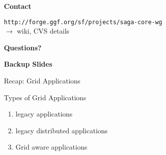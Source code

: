 \documentclass[%
  pdf,
  colorBG,
  slideColor,
  frames,
  ogf
]{prosper}
\newcommand{\T}[1]{\texttt{#1}}
\newcommand{\B}[1]{\textbf{#1}}
\newcommand{\dn}{\vspace*{+1em}}
\begin{document}

 \begin{slide}{}
 
 
 \begin{center}
  \large \B{Contact}\\[10mm]
 \end{center}

 \T{http://forge.ggf.org/sf/projects/saga-core-wg}\\[10mm]

 $\longrightarrow$ wiki, CVS details

 
 \end{slide}
 

 \begin{slide}{}
 
 \dn\dn\dn\dn\dn\dn\dn
 \begin{center}
  \Huge \B{Questions?}\\[10mm]
 \end{center}
 
 \end{slide}
 

 \begin{slide}{}
 
 \dn\dn\dn\dn\dn\dn\dn
 \begin{center}
  \Huge \B{Backup Slides}\\[10mm]
 \end{center}
 
 \end{slide}
 
 
 \begin{slide}{Recap: Grid Applications}
 
  \dn
  Types of Grid Applications
  \dn
 
  \begin{enumerate}
   \item legacy applications
   \item legacy distributed applications
   \item Grid aware applications
  \end{enumerate}
 
 \end{slide}
 
\end{document}

